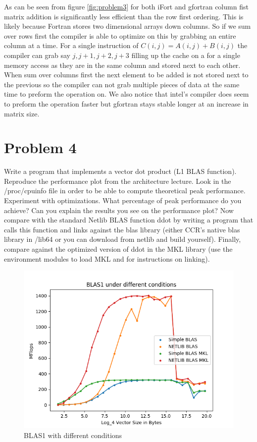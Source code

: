 \documentclass[12pt]{article}
\theoremstyle{plain}
\theoremstyle{definition}
\begin{document}
As can be seen from figure \ref{fig:problem3} for both iFort and gfortran  column fist matrix addition is significantly less efficient than the row first ordering. This is likely because Fortran stores two dimensional arrays down columns. So if we sum over rows first the compiler is able to optimize on this by grabbing an entire column at a time. For a single instruction of $C(i,j) = A(i,j) + B(i,j)$ the compiler can grab say $j,j+1,j+2,j+3$ filling up the cache on a for a single memory access as they are in the same column and stored next to each other. When sum over columns first the next element to be added is not stored next to the previous so the compiler can not grab multiple pieces of data at the same time to preform the operation on. We also notice that intel's compiler does seem to preform the operation faster but gfortran stays stable longer at an increase in matrix size.

 
\section*{Problem 4}
Write a program that implements a vector dot product (L1 BLAS function). Reproduce
the performance plot from the architecture lecture. Look in the /proc/cpuinfo file in
order to be able to compute theoretical peak performance. Experiment with optimizations.
What percentage of peak performance do you achieve? Can you explain the results
you see on the performance plot?
Now compare with the standard Netlib BLAS function ddot by writing a program that
calls this function and links against the blas library (either CCR’s native blas library in
/lib64 or you can download from netlib and build yourself).
Finally, compare against the optimized version of ddot in the MKL library (use the
environment modules to load MKL and for instructions on linking).

\begin{figure}  
\label{fig:problem4}
\includegraphics[scale=0.7]{problem4.png}
\caption{BLAS1 with different conditions}
\end{figure}
\end{document}

